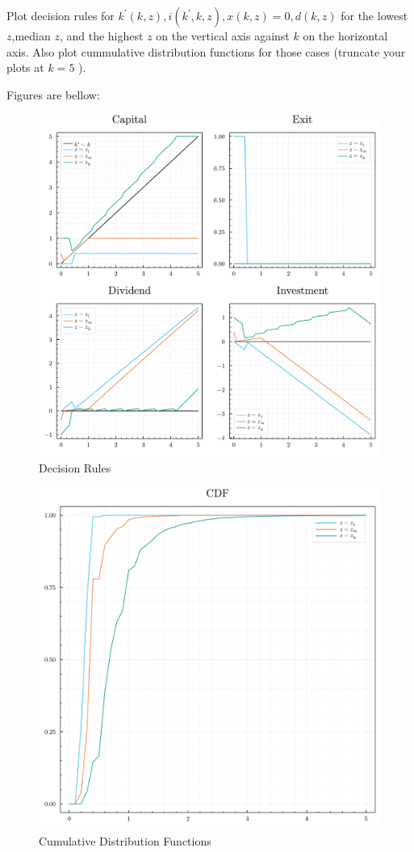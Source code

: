 \documentclass[12pt]{amsart}
\begin{document}
{{\begin{exercise}
    Plot decision rules for $k^{\prime}(k, z), i\left(k^{\prime}, k, z\right), x(k, z)=0, d(k, z)$ for the lowest $z$,median $z$, and the highest $z$ on the vertical axis against $k$ on the horizontal axis. Also plot cummulative distribution functions for those cases (truncate your plots at $k=5$ ).
\end{exercise}
\begin{answer}
    Figures are bellow:
    \begin{figure}\caption{Decision Rules}\label{fig:decision_rules}
        \includegraphics[scale=0.61]{pol_funcs.pdf}
    \end{figure}
    \begin{figure}\caption{Cumulative Distribution Functions}\label{fig:cdfs}
        \includegraphics[scale=0.55]{cdf.pdf}

\end{figure}
\end{answer}}}
\end{document}
